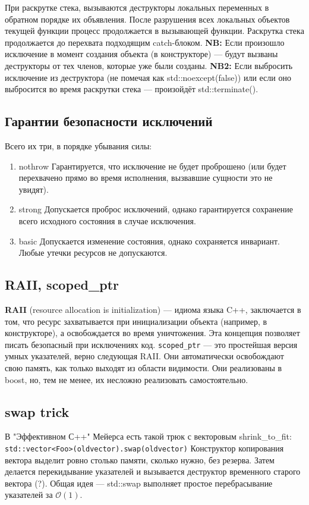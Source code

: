 \documentclass[15pt, a4paper]{article}
\newcommand{\nl}{\newline}
\begin{document}
При раскрутке стека, вызываются деструкторы локальных переменных в обратном порядке их объявления.
После разрушения всех локальных объектов текущей функции процесс продолжается в вызывающей функции. Раскрутка стека продолжается до перехвата подходящим catch-блоком. \nl
\textbf{NB:} Если произошло исключение в момент создания объекта (в конструкторе) --- будут вызваны деструкторы от тех членов, которые уже были созданы. \nl
\textbf{NB2:} Если выбросить исключение из деструктора (не помечая как std::noexcept(false)) или если оно выбросится во время раскрутки стека --- произойдёт std::terminate().
\subsection{Гарантии безопасности исключений}
Всего их три, в порядке убывания силы:
\begin{enumerate}
    \item nothrow \nl
    Гарантируется, что исключение не будет проброшено (или будет перехвачено прямо во время исполнения, вызвавшие сущности это не увидят).
    \item strong \nl
    Допускается проброс исключений, однако гарантируется сохранение всего исходного состояния в случае исключения.
    \item basic \nl
    Допускается изменение состояния, однако сохраняется инвариант. Любые утечки ресурсов не допускаются.
\end{enumerate}
\subsection{RAII, scoped\_ptr}
\textbf{RAII} (resource allocation is initialization) --- идиома языка C++, заключается в том, что ресурс захватывается при инициализации объекта (например, в конструкторе),
а освобождается во время уничтожения. Эта концепция позволяет писать безопасный при исключениях код. \nl
\texttt{scoped\_ptr} --- это простейшая версия умных указателей, верно следующая RAII. Они автоматически освобождают свою память, как только выходят из области видимости.
Они реализованы в boost, но, тем не менее, их несложно реализовать самостоятельно.
\subsection{swap trick}
В "Эффективном С++" Мейерса есть такой трюк с векторовым shrink\_to\_fit: \nl
\texttt{std::vector<Foo>(oldvector).swap(oldvector)} \nl
Конструктор копирования вектора выделит ровно столько памяти, сколько нужно, без резерва. Затем делается перекидывание указателей и вызывается деструктор временного старого вектора (?).\nl
Общая идея --- std::swap выполняет простое перебрасывание указателей за $\mathcal{O}(1)$.
\end{document}
